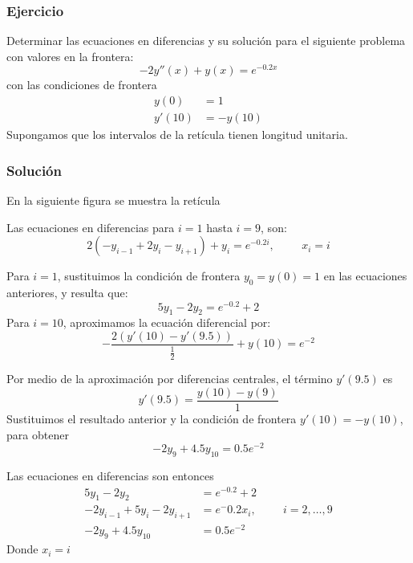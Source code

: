 \begin{frame}
\frametitle{Ejercicio}
Determinar las ecuaciones en diferencias y su soluci\'{o}n para el siguiente problema con valores en la frontera:
\[ -2y''(x) + y(x) = e^{-0.2x} \]
con las condiciones de frontera
\[ \begin{split} 
y(0) &= 1 \\
y'(10) &= -y(10)
\end{split} \]
Supongamos que los intervalos de la ret\'{i}cula tienen longitud unitaria.
\end{frame}
\begin{frame}
\frametitle{Soluci\'{o}n}
En la siguiente figura se muestra la ret\'{i}cula
\begin{center}
\end{center}
Las ecuaciones en diferencias para $i=1$ hasta $i=9$, son:
\[ 2(-y_{i-1}+2y_{i}-y_{i+1}) + y_{i} = e^{-0.2i}, \hspace{1cm} x_{i}=i \]
\end{frame}
\begin{frame}
Para $i=1$, sustituimos la condici\'{o}n de frontera $y_{0}=y(0)=1$ en las ecuaciones anteriores, y resulta que:
\[ 5y_{1}-2y_{2} = e^{-0.2} +2\]
Para $i=10$, aproximamos la ecuaci\'{o}n diferencial por:
\[ - \dfrac{2(y'(10)- y'(9.5))}{\frac{1}{2}} + y(10) = e^{-2}\]
\end{frame}
\begin{frame}
Por medio de la aproximaci\'{o}n por diferencias centrales, el t\'{e}rmino $y'(9.5)$ es
\[ y'(9.5) = \dfrac{y(10)-y(9)}{1}\]
Sustituimos el resultado anterior y la condici\'{o}n de frontera $y'(10)=-y(10)$, para obtener
\[ -2y_{9} + 4.5y_{10} =  0.5 e^{-2} \]
\end{frame}
\begin{frame}
Las ecuaciones en diferencias son entonces
\[ \begin{split}
5y_{1} - 2y_{2} &= e^{-0.2} +2 \\
-2y_{i-1} + 5y_{i} - 2y_{i+1} &= e^-0.2x_{i}, \hspace{1cm} i=2,\ldots,9 \\
-2y_{9} + 4.5 y_{10} &= 0.5 e^{-2}
\end{split} \]
Donde $x_{i}=i$
\end{frame}
